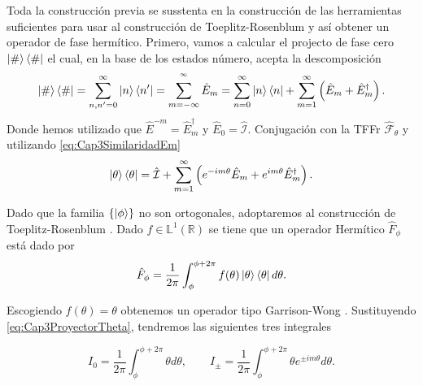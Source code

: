             Toda la construcción previa se susstenta en la construcción de las herramientas suficientes para usar al construcción de Toeplitz-Rosenblum y así obtener un operador de fase hermítico. Primero, vamos a calcular el projecto de fase cero $\ket{\#}\bra{\#}$ el cual, en la base de los estados número, acepta la descomposición
            \begin{equation}
                \ket{\#}\bra{\#} = \sum_{n,n'=0}^{\infty} \ket{n}\bra{n'} = \sum_{m=-\infty}^{^\infty} \hat{E}_m = \sum_{n=0}^{\infty}\ket{n}\bra{n} + \sum_{m=1}^{\infty} \left(\hat{E}_m + \hat{E}_m^\dagger\right).
            \end{equation}
            Donde hemos utilizado que $\hat{E}^{-m} = \hat{E}_m^\dagger$ y $\hat{E}_0 = \hat{\mathcal{I}}$. Conjugación con la TFFr $\hat{\mathcal{F}}_\theta$ y utilizando \ref{eq:Cap3SimilaridadEm}
            \begin{equation}\label{eq:Cap3ProyectorTheta}
                \ket{\theta}\bra{\theta} = \hat{\mathcal{I}} + \sum_{m=1}^{\infty} \left(e^{-im\theta}\hat{E}_m + e^{im\theta} \hat{E}_m^\dagger \right).
            \end{equation}

            Dado que la familia $\{\ket{\phi}\}$ no son ortogonales, adoptaremos al construcción de Toeplitz-Rosenblum \cite{rosenblum1962self}. Dado $f \in \mathbb{L}^1(\mathbb{R})$ se tiene que un operador Hermítico $\hat{F}_\phi$ está dado por
            \begin{equation}
                \hat{F}_\phi = \frac{1}{2\pi} \int_{\phi}^{\phi+2\pi} f(\theta)\ket{\theta}\bra{\theta}d\theta.
            \end{equation}

            Escogiendo $f(\theta) = \theta$ obtenemos un operador tipo Garrison-Wong \cite{Garrison1970}. Sustituyendo \ref{eq:Cap3ProyectorTheta}, tendremos las siguientes tres integrales

            \begin{equation}
                I_0 = \frac{1}{2\pi}\int_\phi^{\phi+2\pi} \theta d\theta, \qquad I_\pm  = \frac{1}{2\pi}\int_\phi^{\phi+2\pi}\theta e^{\pm im\theta}d\theta.
            \end{equation}

